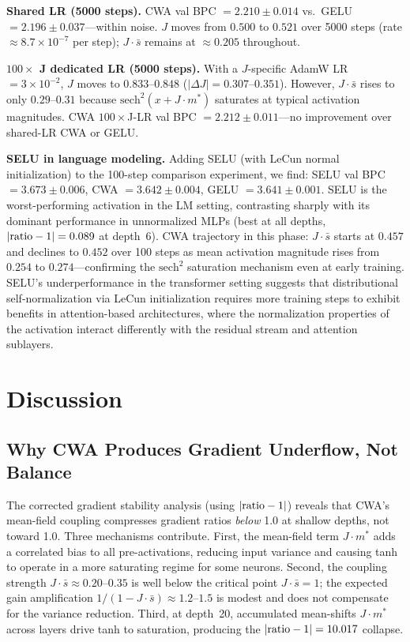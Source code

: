 \documentclass[11pt,twocolumn,letterpaper]{article}
\begin{document}
\textbf{Shared LR (5000 steps).} CWA val BPC $= 2.210 \pm 0.014$ vs.\ GELU $= 2.196 \pm 0.037$---within noise. $J$
moves from $0.500$ to $0.521$ over 5000 steps (rate $\approx 8.7 \times 10^{-7}$ per step); $J\cdot\bar{s}$ remains at
$\approx 0.205$ throughout.

\textbf{$100\times$ J dedicated LR (5000 steps).} With a $J$-specific AdamW LR $= 3 \times 10^{-2}$, $J$ moves to
$0.833$--$0.848$ ($|\Delta J| = 0.307$--$0.351$). However, $J\cdot\bar{s}$ rises to only $0.29$--$0.31$ because
$\text{sech}^2(x + J\cdot m^*)$ saturates at typical activation magnitudes. CWA $100\times$J-LR val BPC $= 2.212 \pm 0.011$---no
improvement over shared-LR CWA or GELU.

\textbf{SELU in language modeling.} Adding SELU (with LeCun normal initialization) to the 100-step comparison experiment,
we find: SELU val BPC $= 3.673 \pm 0.006$, CWA $= 3.642 \pm 0.004$, GELU $= 3.641 \pm 0.001$. SELU is the
worst-performing activation in the LM setting, contrasting sharply with its dominant performance in unnormalized MLPs
(best at all depths, $|{\rm ratio}-1| = 0.089$ at depth~6). CWA trajectory in this phase: $J\cdot\bar{s}$ starts at
$0.457$ and declines to $0.452$ over 100 steps as mean activation magnitude rises from $0.254$ to $0.274$---confirming
the $\text{sech}^2$ saturation mechanism even at early training. SELU's underperformance in the transformer setting
suggests that distributional self-normalization via LeCun initialization requires more training steps to exhibit benefits
in attention-based architectures, where the normalization properties of the activation interact differently with the
residual stream and attention sublayers.

\section{Discussion}
\label{sec:discussion}

\subsection{Why CWA Produces Gradient Underflow, Not Balance}

The corrected gradient stability analysis (using $|{\rm ratio}-1|$) reveals that CWA's mean-field coupling compresses
gradient ratios \emph{below} 1.0 at shallow depths, not toward 1.0. Three mechanisms contribute. First, the mean-field
term $J\cdot m^*$ adds a correlated bias to all pre-activations, reducing input variance and causing tanh to operate in a
more saturating regime for some neurons. Second, the coupling strength $J\cdot\bar{s} \approx 0.20$--$0.35$ is well below
the critical point $J\cdot\bar{s} = 1$; the expected gain amplification $1/(1-J\cdot\bar{s}) \approx 1.2$--$1.5$ is
modest and does not compensate for the variance reduction. Third, at depth~20, accumulated mean-shifts $J\cdot m^*$ across
layers drive tanh to saturation, producing the $|{\rm ratio}-1| = 10.017$ collapse.
\end{document}
